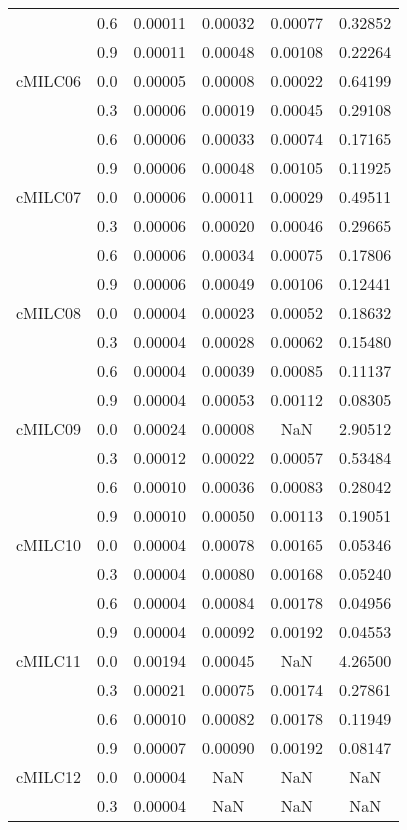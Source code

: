 \begin{longtable}{cccccc}
        & 0.6 & 0.00011 & 0.00032 & 0.00077 & 0.32852 \\
        & 0.9 & 0.00011 & 0.00048 & 0.00108 & 0.22264 \\
cMILC06 & 0.0 & 0.00005 & 0.00008 & 0.00022 & 0.64199 \\
        & 0.3 & 0.00006 & 0.00019 & 0.00045 & 0.29108 \\
        & 0.6 & 0.00006 & 0.00033 & 0.00074 & 0.17165 \\
        & 0.9 & 0.00006 & 0.00048 & 0.00105 & 0.11925 \\
cMILC07 & 0.0 & 0.00006 & 0.00011 & 0.00029 & 0.49511 \\
        & 0.3 & 0.00006 & 0.00020 & 0.00046 & 0.29665 \\
        & 0.6 & 0.00006 & 0.00034 & 0.00075 & 0.17806 \\
        & 0.9 & 0.00006 & 0.00049 & 0.00106 & 0.12441 \\
cMILC08 & 0.0 & 0.00004 & 0.00023 & 0.00052 & 0.18632 \\
        & 0.3 & 0.00004 & 0.00028 & 0.00062 & 0.15480 \\
        & 0.6 & 0.00004 & 0.00039 & 0.00085 & 0.11137 \\
        & 0.9 & 0.00004 & 0.00053 & 0.00112 & 0.08305 \\
cMILC09 & 0.0 & 0.00024 & 0.00008 & NaN & 2.90512 \\
        & 0.3 & 0.00012 & 0.00022 & 0.00057 & 0.53484 \\
        & 0.6 & 0.00010 & 0.00036 & 0.00083 & 0.28042 \\
        & 0.9 & 0.00010 & 0.00050 & 0.00113 & 0.19051 \\
cMILC10 & 0.0 & 0.00004 & 0.00078 & 0.00165 & 0.05346 \\
        & 0.3 & 0.00004 & 0.00080 & 0.00168 & 0.05240 \\
        & 0.6 & 0.00004 & 0.00084 & 0.00178 & 0.04956 \\
        & 0.9 & 0.00004 & 0.00092 & 0.00192 & 0.04553 \\
cMILC11 & 0.0 & 0.00194 & 0.00045 & NaN & 4.26500 \\
        & 0.3 & 0.00021 & 0.00075 & 0.00174 & 0.27861 \\
        & 0.6 & 0.00010 & 0.00082 & 0.00178 & 0.11949 \\
        & 0.9 & 0.00007 & 0.00090 & 0.00192 & 0.08147 \\
cMILC12 & 0.0 & 0.00004 & NaN & NaN & NaN \\
        & 0.3 & 0.00004 & NaN & NaN & NaN \\

\end{longtable}
